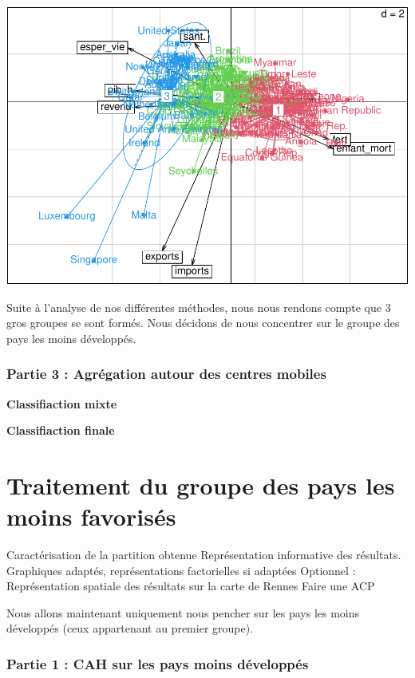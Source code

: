 \documentclass[
]{article}
\begin{document}
\includegraphics{Projet_files/figure-latex/unnamed-chunk-29-1.pdf}

Suite à l'analyse de nos différentes méthodes, nous nous rendons compte
que 3 gros groupes se sont formés. Nous décidons de nous concentrer sur
le groupe des pays les moins développés.

\hypertarget{partie-3-agruxe9gation-autour-des-centres-mobiles}{%
\subsubsection{Partie 3 : Agrégation autour des centres
mobiles}\label{partie-3-agruxe9gation-autour-des-centres-mobiles}}

\textbf{Classifiaction mixte}

\textbf{Classifiaction finale}

\hypertarget{traitement-du-groupe-des-pays-les-moins-favorisuxe9s}{%
\section{Traitement du groupe des pays les moins
favorisés}\label{traitement-du-groupe-des-pays-les-moins-favorisuxe9s}}

Caractérisation de la partition obtenue Représentation informative des
résultats. Graphiques adaptés, représentations factorielles si adaptées
Optionnel : Représentation spatiale des résultats sur la carte de Rennes
Faire une ACP

Nous allons maintenant uniquement nous pencher sur les pays les moins
développés (ceux appartenant au premier groupe).

\hypertarget{partie-1-cah-sur-les-pays-moins-duxe9veloppuxe9s}{%
\subsubsection{Partie 1 : CAH sur les pays moins
développés}\label{partie-1-cah-sur-les-pays-moins-duxe9veloppuxe9s}}
\end{document}
